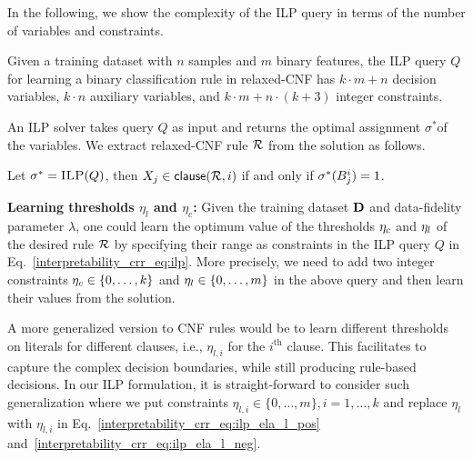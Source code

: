 In the following, we show the complexity of the ILP query in terms of the number of variables and constraints. 

\begin{proposition}
	Given a training dataset with $ n $ samples and $ m $ binary features, the ILP query $ Q $ for learning a binary classification rule in relaxed-CNF has $ k\cdot m + n $ decision variables, $ k\cdot n $ auxiliary variables, and  $ k\cdot m + n\cdot (k+3)  $ integer constraints. 
\end{proposition}

An ILP solver takes  query  $ Q $ as input and returns the optimal assignment $ \sigma^* $of the variables.
We extract relaxed-CNF rule ${\mathcal{R}}$ from the solution  as follows. 


\begin{construction}
	\label{interpretability_crr_cons:rule}
	Let $\sigma^* = \textsc{ILP}(Q)$, then $X_j \in {\ensuremath{\mathsf{clause}}(\ensuremath{{\mathcal{R}}},i)}$ if and only if $\sigma^*(B_{j}^i) = 1$.
\end{construction}






\textbf{Learning thresholds $ \eta_l $ and $ \eta_c $:}
Given the training dataset $ \mathbf{D} $ and data-fidelity parameter $ \lambda $, one could learn the optimum value of the thresholds $ \eta_{c} $ and $ \eta_l $ of the desired rule $ {\mathcal{R}} $  by specifying their range as constraints in the ILP query $ Q $ in Eq.~\ref{interpretability_crr_eq:ilp}. More precisely, we need to add two integer constraints  $ \eta_c  \in \{0,\dots,k\}$ and $ \eta_l \in \{0,\dots,m\} $ in the above query and then learn their values from the solution.  

A more generalized version to CNF rules would be to learn different thresholds on literals for different clauses, i.e., $ \eta_{l,i} $ for the $ i^\text{th} $ clause. This facilitates to capture the complex decision boundaries, while still producing rule-based decisions. 
In our ILP formulation, it is straight-forward to consider such generalization where we put constraints $ \eta_{l,i} \in \{0,\dots,m\}, i=1,\dots, k $ and replace
 $ \eta_l $ with $ \eta_{l,i} $ in Eq.~\ref{interpretability_crr_eq:ilp_ela_l_pos} and~\ref{interpretability_crr_eq:ilp_ela_l_neg}. 

